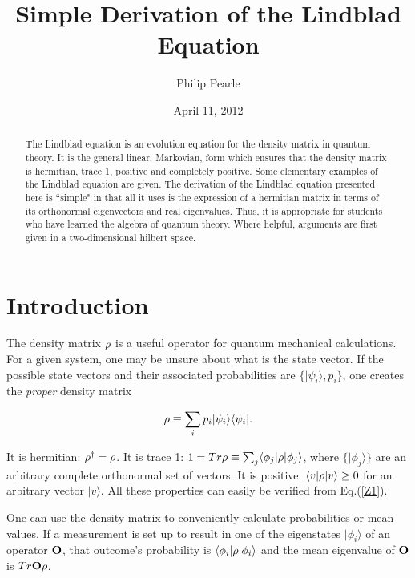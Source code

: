 \documentclass[aps,pra,amssymb, amsfonts,amsmath,showpacs, superscriptaddress,12pt]{revtex4}
\begin{document}
  
  \title{Simple Derivation of the Lindblad Equation}
\author{Philip Pearle}
\date{April 11, 2012}
\begin{abstract}
{The Lindblad equation is an evolution equation for the density matrix in quantum theory.  It is the general linear,  Markovian, form which ensures that the density matrix is hermitian, trace 1, positive and completely positive. Some elementary examples of the Lindblad equation are given. The derivation of the Lindblad  equation presented here is ``simple" in  that all it uses is the expression of a hermitian matrix in terms of its orthonormal eigenvectors and real eigenvalues.  Thus, it is appropriate for students who have learned the algebra of quantum theory. Where helpful, arguments are first given in a two-dimensional hilbert space. } 
\end{abstract}

\maketitle

\section{Introduction}

The density matrix ${\bf\rho}$ is a useful operator for quantum mechanical calculations.  For a given system, one may be unsure about what is the state vector.  If the possible state vectors and their associated probabilities are $\{|\psi_{i}\rangle, p_{i}\}$, one creates the \textit{proper}\cite{dEspagnat} density matrix 

\begin{equation}\label{Z1}
{\bf\rho}\equiv \sum_{i}p_{i}|\psi_{i}\rangle\langle\psi_{i}|.
\end{equation}

It is hermitian: ${\bf\rho}^{\dagger}={\bf\rho}$.  It is trace 1: $1= Tr{\bf\rho}\equiv \sum_{j}\langle \phi_{j}|{\bf\rho}|\phi_{j} \rangle$, where $\{|\phi_{j}\rangle\}$ are an arbitrary complete orthonormal set of vectors.  It is positive:  $\langle v|{\bf\rho}|v\rangle\geq 0$ for an arbitrary vector $ |v\rangle$.  All these properties can easily be verified from Eq.(\ref{Z1}).  

One can use the density matrix to conveniently calculate probabilities or mean values.  If a measurement is set up to result in one of the eigenstates  $|\phi_{i}\rangle$ of an operator ${\bf O}$, that outcome's probability is $\langle\phi_{i}|{\bf\rho}|\phi_{i}\rangle$ and the mean eigenvalue of ${\bf O}$ is $Tr{\bf O}{\bf\rho}$.
\end{document}
